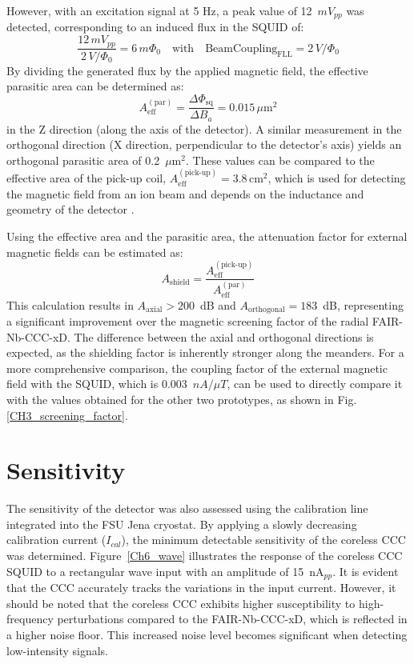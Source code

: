 \documentclass[12pt,a4paper]{report}
\begin{document}
        However, with an excitation signal at 5 Hz, a peak value of 12~$mV_{pp}$ was detected, corresponding to an induced flux in the SQUID of:
        \begin{equation}
        	\frac{12\,mV_{pp}}{2\,V/\Phi_0} = 6\,m\Phi_0 \quad \text{with} \quad \text{BeamCoupling}_{\text{FLL}} = 2\,V/\Phi_0
        \end{equation}
        By dividing the generated flux by the applied magnetic field, the effective parasitic area can be determined as:
        \begin{equation}
        	A_{\text{eff}}^{(\text{par})} = \frac{\Delta\Phi_{\text{sq}}}{\Delta B_a} = 0.015\,\mu\text{m}^2
        \end{equation}
        in the Z direction (along the axis of the detector). A similar measurement in the orthogonal direction (X direction, perpendicular to the detector's axis) yields an orthogonal parasitic area of 0.2~$\mu\text{m}^2$. These values can be compared to the effective area of the pick-up coil, $A_{\text{eff}}^{(\text{pick-up})} = 3.8\,\text{cm}^2$, which is used for detecting the magnetic field from an ion beam and depends on the inductance and geometry of the detector \cite{CorelessCCC}.
        
        Using the effective area and the parasitic area, the attenuation factor for external magnetic fields can be estimated as:
        \begin{equation}
        	A_{\text{shield}} = \frac{A_{\text{eff}}^{(\text{pick-up})}}{A_{\text{eff}}^{(\text{par})}}
        \end{equation}
        This calculation results in $A_{\text{axial}} > 200$~dB and $A_{\text{orthogonal}} = 183$~dB, representing a significant improvement over the magnetic screening factor of the radial FAIR-Nb-CCC-xD. The difference between the axial and orthogonal directions is expected, as the shielding factor is inherently stronger along the meanders. For a more comprehensive comparison, the coupling factor of the external magnetic field with the SQUID, which is 0.003~$nA/\mu T$, can be used to directly compare it with the values obtained for the other two prototypes, as shown in Fig.\ref{CH3_screening_factor}.
        
        \section{Sensitivity}
       The sensitivity of the detector was also assessed using the calibration line integrated into the FSU Jena cryostat. By applying a slowly decreasing calibration current ($I_{cal}$), the minimum detectable sensitivity of the coreless CCC was determined. Figure~\ref{Ch6_wave} illustrates the response of the coreless CCC SQUID to a rectangular wave input with an amplitude of 15~nA$_{pp}$. It is evident that the CCC accurately tracks the variations in the input current. However, it should be noted that the coreless CCC exhibits higher susceptibility to high-frequency perturbations compared to the FAIR-Nb-CCC-xD, which is reflected in a higher noise floor. This increased noise level becomes significant when detecting low-intensity signals.
       
\end{document}
